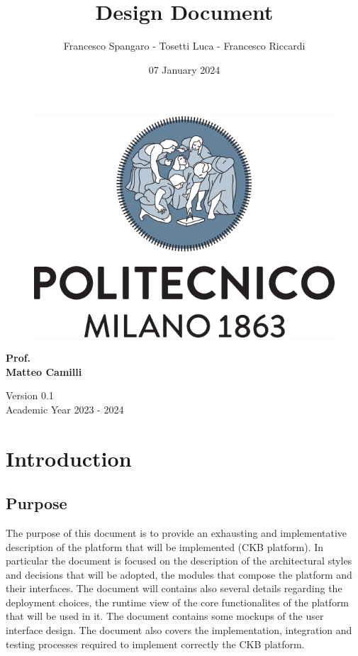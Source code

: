 \documentclass{article}
\title{\Huge{\textbf{Design Document}}}
\author{\Large{Francesco Spangaro - Tosetti Luca - Francesco Riccardi}}
\date{07 January 2024}
\begin{document}
\maketitle

\begin{figure}[h]
    \centering
    \includegraphics[scale=0.6]{politecnico-di-milano-logo.png}
\end{figure}

\vspace*{1cm}
\begin{center}
      \Large{\textbf{Prof.}} \\
      \Large{\textbf{Matteo Camilli}}
\end{center}
\vspace*{1cm}

\begin{center}
      \large{Version 0.1} \\
      \large{Academic Year 2023 - 2024}
\end{center}
\newpage
\tableofcontents


\pagestyle{IntroductionStyle}

\section{Introduction}
\subsection{Purpose}
The purpose of this document is to provide an exhausting and implementative
description of the platform that will be implemented (CKB platform).
In particular the document is focused on the description of the architectural styles and decisions
that will be adopted, the modules that compose the platform and their interfaces.
The document will contains also several details regarding the deployment choices,
the runtime view of the core functionalites of the platform that will be used in it.
The document contains some mockups of the user interface design.
The document also covers the implementation, integration and testing
processes required to implement correctly the CKB platform.
\end{document}
